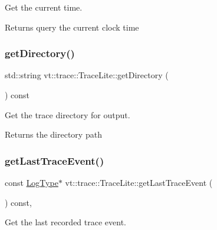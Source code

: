 Get the current time. 

\begin{DoxyReturn}{Returns}
query the current clock time 
\end{DoxyReturn}
\mbox{\label{structvt_1_1trace_1_1_trace_lite_aee5f10410a94c3149eefe595ccb2bbab}} 
\subsubsection{\texorpdfstring{get\+Directory()}{getDirectory()}}
{\footnotesize\ttfamily std\+::string vt\+::trace\+::\+Trace\+Lite\+::get\+Directory (\begin{DoxyParamCaption}{ }\end{DoxyParamCaption}) const\hspace{0.3cm}{\ttfamily [inline]}}



Get the trace directory for output. 

\begin{DoxyReturn}{Returns}
the directory path 
\end{DoxyReturn}
\mbox{\label{structvt_1_1trace_1_1_trace_lite_a356f20b9186cf0ed1fdc9881186c9f49}} 
\subsubsection{\texorpdfstring{get\+Last\+Trace\+Event()}{getLastTraceEvent()}}
{\footnotesize\ttfamily const \hyperlink{structvt_1_1trace_1_1_trace_lite_aeb73e523d31829d3163c877b145afa2a}{Log\+Type}$\ast$ vt\+::trace\+::\+Trace\+Lite\+::get\+Last\+Trace\+Event (\begin{DoxyParamCaption}{ }\end{DoxyParamCaption}) const\hspace{0.3cm}{\ttfamily [inline]}, {\ttfamily [noexcept]}}



Get the last recorded trace event. 

